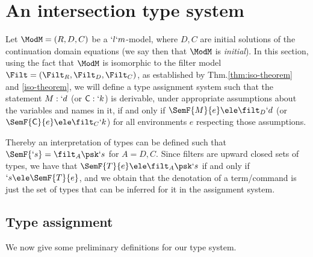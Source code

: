 \documentclass{lmcs}
\begin{document}
 \section{An intersection type system} \label{sec:types}

Let ${\ModM} = (R,D,C)$ be a $`l`m$-model, where $D,C$ are initial solutions of the continuation domain equations (we say then that $\ModM$ is \emph{initial}).
In this section, using the fact that ${\ModM}$ is isomorphic to the filter model $\Filt = (\Filt_R,\Filt_D,\Filt_C)$, as established by Thm.\skp\ref{thm:iso-theorem} and \ref{iso-theorem}, we will define a type assignment system such that the statement $M : `d$ (or $\textrm{\sf C}: `k$) is derivable, under appropriate assumptions about the variables and names in it, if and only if $\SemF { M }{ e } \ele \filt_D `d$ (or $\SemF { \Cmd}{ e } \ele \filt_C `k$) for all environments $e$ respecting those assumptions.

Thereby an interpretation of types can be defined such that $\SemF { `s } = \filt_A\psk `s$ for $A=D,C$. Since filters are upward closed sets of types, we have that $\SemF { T}{ e } \ele \filt_A\psk `s$ if and only if $`s \ele \SemF { T}{ e }$,
and we obtain that the denotation of a term/command is just the set of types that can be inferred for it in the assignment system.


 \subsection{Type assignment} \label{subsec:Type assignment}
We now give some preliminary definitions for our type system.
\end{document}
